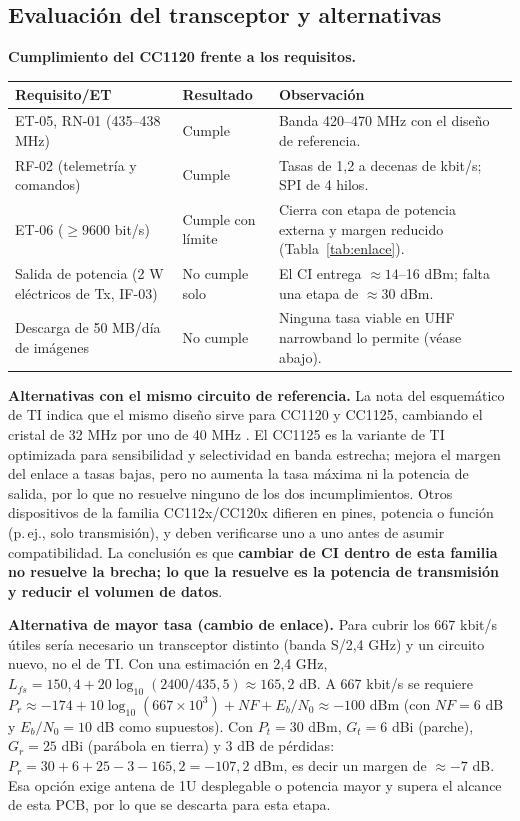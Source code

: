 \documentclass[11pt,letterpaper]{article}
\begin{document}
\subsection{Evaluación del transceptor y alternativas}
\label{sec:alt}
\textbf{Cumplimiento del CC1120 frente a los requisitos.}
\begin{center}\small
\begin{tabular}{L{3.2cm}L{2.6cm}L{8.6cm}}
\toprule Requisito/ET & Resultado & Observación \\
\midrule
ET-05, RN-01 (435--438 MHz) & Cumple & Banda 420--470 MHz con el diseño de referencia. \\
RF-02 (telemetría y comandos) & Cumple & Tasas de 1,2 a decenas de kbit/s; SPI de 4 hilos. \\
ET-06 ($\geq9600$ bit/s) & Cumple con límite & Cierra con etapa de potencia externa y margen reducido (Tabla~\ref{tab:enlace}). \\
Salida de potencia (2 W eléctricos de Tx, IF-03) & No cumple solo & El CI entrega $\approx14$--16 dBm; falta una etapa de $\approx30$ dBm. \\
Descarga de 50 MB/día de imágenes & No cumple & Ninguna tasa viable en UHF narrowband lo permite (véase abajo). \\
\bottomrule
\end{tabular}
\end{center}

\textbf{Alternativas con el mismo circuito de referencia.} La nota del esquemático de TI indica que el mismo diseño sirve para CC1120 y CC1125, cambiando el cristal de 32 MHz por uno de 40 MHz \cite{cc1120em}. El CC1125 es la variante de TI optimizada para sensibilidad y selectividad en banda estrecha; mejora el margen del enlace a tasas bajas, pero no aumenta la tasa máxima ni la potencia de salida, por lo que no resuelve ninguno de los dos incumplimientos. Otros dispositivos de la familia CC112x/CC120x difieren en pines, potencia o función (p.\,ej., solo transmisión), y deben verificarse uno a uno antes de asumir compatibilidad. La conclusión es que \textbf{cambiar de CI dentro de esta familia no resuelve la brecha; lo que la resuelve es la potencia de transmisión y reducir el volumen de datos}.

\textbf{Alternativa de mayor tasa (cambio de enlace).} Para cubrir los 667 kbit/s útiles sería necesario un transceptor distinto (banda S/2,4 GHz) y un circuito nuevo, no el de TI. Con una estimación en 2,4 GHz, $L_{fs}=150{,}4+20\log_{10}(2400/435{,}5)\approx165{,}2$ dB. A 667 kbit/s se requiere $P_r\approx-174+10\log_{10}(667\times10^3)+NF+E_b/N_0\approx-100$ dBm (con $NF=6$ dB y $E_b/N_0=10$ dB como supuestos). Con $P_t=30$ dBm, $G_t=6$ dBi (parche), $G_r=25$ dBi (parábola en tierra) y 3 dB de pérdidas: $P_r=30+6+25-3-165{,}2=-107{,}2$ dBm, es decir un margen de $\approx-7$ dB. Esa opción exige antena de 1U desplegable o potencia mayor y supera el alcance de esta PCB, por lo que se descarta para esta etapa.
\end{document}
